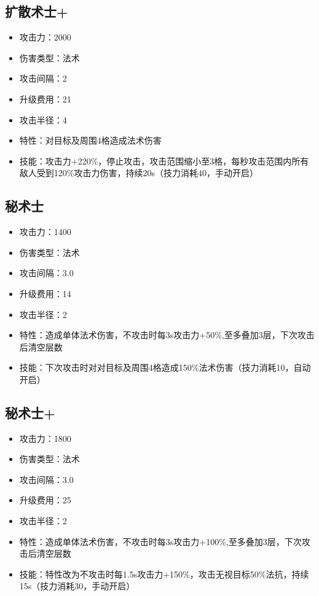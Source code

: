 \documentclass[a4paper,12pt]{article}
\begin{document}
		\subsection{扩散术士+}
			\begin{itemize}
				\item 攻击力：2000
				\item 伤害类型：法术
				\item 攻击间隔：2
				\item 升级费用：21
				\item 攻击半径：4
				\item 特性：对目标及周围4格造成法术伤害
				\item 技能：攻击力+220\%，停止攻击，攻击范围缩小至3格，每秒攻击范围内所有敌人受到120\%攻击力伤害，持续20s（技力消耗40，手动开启）
			\end{itemize}
		\subsection{秘术士}
			\begin{itemize}
				\item 攻击力：1400
				\item 伤害类型：法术
				\item 攻击间隔：3.0
				\item 升级费用：14
				\item 攻击半径：2
				\item 特性：造成单体法术伤害，不攻击时每3s攻击力+50\%,至多叠加3层，下次攻击后清空层数
				\item 技能：下次攻击时对对目标及周围4格造成150\%法术伤害（技力消耗10，自动开启）
			\end{itemize}
		\subsection{秘术士+}
			\begin{itemize}
				\item 攻击力：1800
				\item 伤害类型：法术
				\item 攻击间隔：3.0
				\item 升级费用：25
				\item 攻击半径：2
				\item 特性：造成单体法术伤害，不攻击时每3s攻击力+100\%,至多叠加3层，下次攻击后清空层数
				\item 技能：特性改为不攻击时每1.5s攻击力+150\%，攻击无视目标50\%法抗，持续15s（技力消耗30，手动开启）
			\end{itemize}
\end{document}
